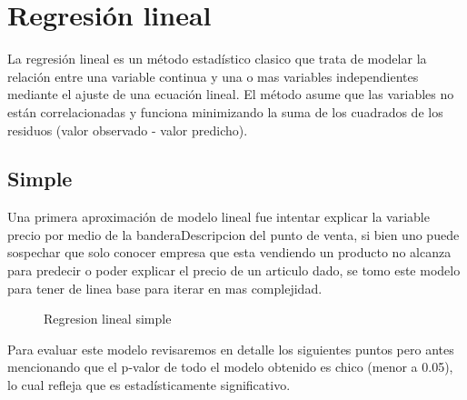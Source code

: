 \section{Regresión lineal}

La regresión lineal es un método estadístico clasico que trata de modelar la relación entre una variable continua y una o mas variables independientes mediante el ajuste de una ecuación lineal. El método asume que las variables no están correlacionadas y funciona minimizando la suma de los cuadrados de los residuos (valor observado - valor predicho). 



\subsection{Simple}



Una primera aproximación de modelo lineal fue intentar explicar la variable precio por medio de la banderaDescripcion del punto de venta, si bien uno puede sospechar que solo conocer empresa que esta vendiendo un producto no alcanza para predecir o poder explicar el precio de un articulo dado, se tomo este modelo para tener de linea base para iterar en mas complejidad.\\

\begin{figure}[h]
\centering
{}%
\caption{Regresion lineal simple}
\label{ln_simple_full}
\end{figure}



Para evaluar este modelo revisaremos en detalle los siguientes puntos pero antes mencionando que el p-valor de todo el modelo obtenido es chico (menor a 0.05), lo cual refleja que es estadísticamente significativo.\\

